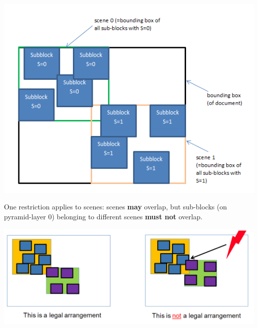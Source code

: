 \begin{DoxyImage}
\includegraphics[width=\textwidth,height=\textheight/2,keepaspectratio=true]{image_document_concept3.PNG}
\end{DoxyImage}
 One restriction applies to scenes\+: scenes {\bfseries may} overlap, but sub-\/blocks (on pyramid-\/layer 0) belonging to different scenes {\bfseries must not} overlap.


\begin{DoxyImage}
\includegraphics[width=\textwidth,height=\textheight/2,keepaspectratio=true]{image_document_concept4.PNG}
\end{DoxyImage}
